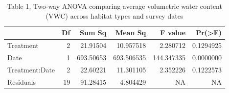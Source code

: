 \begin{table}

\caption{Table 1. Two-way ANOVA comparing average volumetric
               water content (VWC) across habitat types and survey dates}
\centering
\begin{tabular}[t]{l|r|r|r|r|r}
\hline
  & Df & Sum Sq & Mean Sq & F value & Pr(>F)\\
\hline
Treatment & 2 & 21.91504 & 10.957518 & 2.280712 & 0.1294925\\
\hline
Date & 1 & 693.50653 & 693.506535 & 144.347335 & 0.0000000\\
\hline
Treatment:Date & 2 & 22.60221 & 11.301105 & 2.352226 & 0.1222573\\
\hline
Residuals & 19 & 91.28415 & 4.804429 & NA & NA\\
\hline
\end{tabular}
\end{table}
